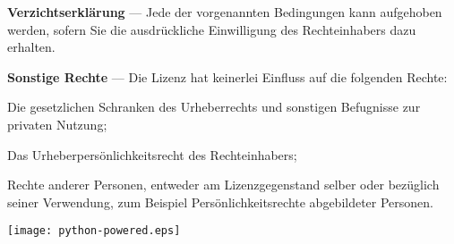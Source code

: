 \noindent
\textbf{Verzichtserklärung} — Jede der vorgenannten Bedingungen kann aufgehoben werden, sofern Sie die ausdrückliche Einwilligung des Rechteinhabers dazu erhalten. 

\noindent
\textbf{Sonstige Rechte} — Die Lizenz hat keinerlei Einfluss auf die folgenden Rechte:
\begin{description}
  \item Die gesetzlichen Schranken des Urheberrechts und sonstigen Befugnisse zur privaten Nutzung;
  \item Das Urheberpersönlichkeitsrecht des Rechteinhabers;
  \item Rechte anderer Personen, entweder am Lizenzgegenstand selber oder bezüglich seiner Verwendung, zum Beispiel Persönlichkeitsrechte abgebildeter Personen.
\end{description}



\vspace*{4cm}
\begin{center}
\texttt{[image: python-powered.eps]}
\end{center}

\mainmatter

\pagestyle{plain}

\tableofcontents
